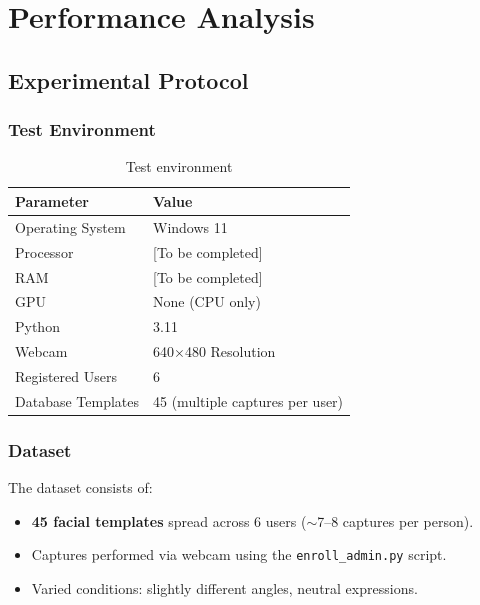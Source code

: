 \chapter{Performance Analysis}

\section{Experimental Protocol}

\subsection{Test Environment}

\begin{table}[H]
    \centering
    \begin{tabular}{ll}
        \toprule
        \textbf{Parameter} & \textbf{Value} \\
        \midrule
        Operating System       & Windows 11 \\
        Processor              & [To be completed] \\
        RAM                    & [To be completed] \\
        GPU                    & None (CPU only) \\
        Python                 & 3.11 \\
        Webcam                 & 640$\times$480 Resolution \\
        Registered Users       & 6 \\
        Database Templates     & 45 (multiple captures per user) \\
        \bottomrule
    \end{tabular}
    \caption{Test environment}
\end{table}

\subsection{Dataset}

The dataset consists of:
\begin{itemize}
    \item \textbf{45 facial templates} spread across 6 users ($\sim$7--8 captures per person).
    \item Captures performed via webcam using the \texttt{enroll\_admin.py} script.
    \item Varied conditions: slightly different angles, neutral expressions.
\end{itemize}

